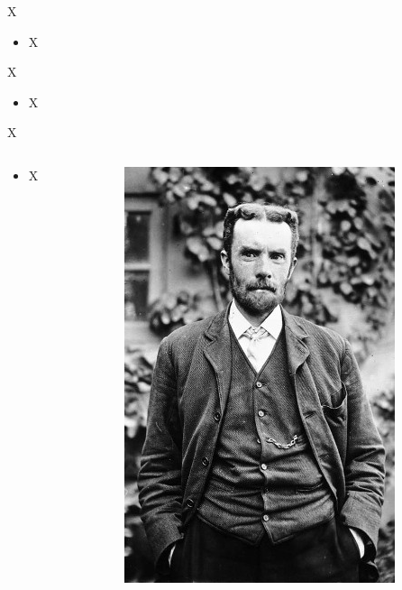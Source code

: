 \documentclass[urlcolor=blue,dvipsnames]{beamer}
\begin{document}
\begin{frame}{X}

\begin{itemize}
\item X
\end{itemize}
\end{frame}


\begin{frame}{X}

\begin{itemize}
\item X
\end{itemize}
\end{frame}


\begin{frame}{X}

\begin{columns}
\begin{column}{0.77\textwidth}
\begin{itemize}
\item X
\end{itemize}
\end{column}
\begin{column}{0.23\textwidth}
\vspace{3mm}

\includegraphics[width=\textwidth]{figs/Heaviside}


\end{column}
\end{columns}
\end{frame}
\end{document}
